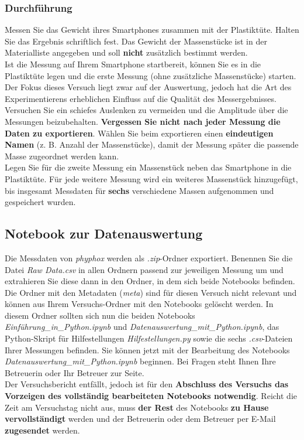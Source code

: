 \documentclass[12pt]{scrbook}
\begin{document}
\subsubsection{Durchführung}

Messen Sie das Gewicht ihres Smartphones zusammen mit der Plastiktüte. Halten Sie das Ergebnis schriftlich fest. Das Gewicht der Massenstücke ist in der Materialliste angegeben und soll \textbf{nicht} zusätzlich bestimmt werden.\\
Ist die Messung auf Ihrem Smartphone startbereit, können Sie es in die Plastiktüte legen und die erste Messung (ohne zusätzliche Massenstücke) starten. Der Fokus dieses Versuch liegt zwar auf der Auswertung, jedoch hat die Art des Experimentierens erheblichen Einfluss auf die Qualität des Messergebnisses. Versuchen Sie ein schiefes Auslenken zu vermeiden und die Amplitude über die Messungen beizubehalten. \textbf{Vergessen Sie nicht nach jeder Messung die Daten zu exportieren}. Wählen Sie beim exportieren einen \textbf{eindeutigen Namen} (z. B. Anzahl der Massenstücke), damit der Messung später die passende Masse zugeordnet werden kann.\\ Legen Sie für die zweite Messung ein Massenstück neben das Smartphone in die Plastiktüte. Für jede weitere Messung wird ein weiteres Massenstück hinzugefügt, bis insgesamt Messdaten für \textbf{sechs} verschiedene Massen aufgenommen und gespeichert wurden. 

\subsection{Notebook zur Datenauswertung}

Die Messdaten von \textit{phyphox} werden als \textit{.zip}-Ordner exportiert. Benennen Sie die Datei \textit{Raw Data.csv} in allen Ordnern passend zur jeweiligen Messung um und extrahieren Sie diese dann in den Ordner, in dem sich beide Notebooks befinden. Die Ordner mit den Metadaten (\textit{meta}) sind für diesen Versuch nicht relevant und können aus Ihrem Versuchs-Ordner mit den Notebooks gelöscht werden. In diesem Ordner sollten sich nun die beiden Notebooks \textit{Einführung\_in\_Python.ipynb} und \textit{Datenauswertung\_mit\_Python.ipynb}, das Python-Skript für Hilfestellungen \textit{Hilfestellungen.py} sowie die sechs \textit{.csv}-Dateien Ihrer Messungen befinden. Sie können jetzt mit der Bearbeitung des Notebooks \textit{Datenauswertung\_mit\_Python.ipynb} beginnen. Bei Fragen steht Ihnen Ihre Betreuerin oder Ihr Betreuer zur Seite.\\
\newline
Der Versuchsbericht entfällt, jedoch ist für den \textbf{Abschluss des Versuchs das Vorzeigen des vollständig bearbeiteten Notebooks notwendig}. Reicht die Zeit am Versuchstag nicht aus, muss \textbf{der Rest} des Notebooks \textbf{zu Hause vervollständigt} werden und der Betreuerin oder dem Betreuer per E-Mail \textbf{zugesendet} werden.
\end{document}
